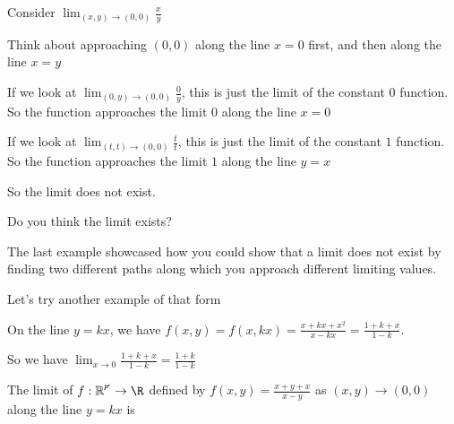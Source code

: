 \documentclass{ximera}
\begin{document}
	\begin{question}
		Consider $\displaystyle\lim_{(x,y) \to (0,0)} \frac{x}{y}$
		\begin{solution}
			\begin{hint}
				Think about approaching $(0,0)$ along the line $x=0$ first, and then along the line $x=y$
			\end{hint}
			\begin{hint}
				If we look at $\displaystyle\lim_{(0,y) \to (0,0)} \frac{0}{y}$, this is just the limit of the constant $0$ function.  So the function approaches the limit $0$ along
				the line $x=0$
			\end{hint}
			\begin{hint}
				If we look at $\displaystyle\lim_{(t,t) \to (0,0)} \frac{t}{t}$, this is just the limit of the constant $1$ function.  So the function approaches the limit $1$ along the 
				line $y=x$
			\end{hint}
			\begin{hint}
				So the limit does not exist.
			\end{hint}
			Do you think the limit exists?
				\begin{multiple-choice}
				\end{multiple-choice}
		\end{solution}
	\end{question}
	
	The last example showcased how you could show that a limit does not exist by finding two different paths along which you approach different limiting values.  
	
	Let's try another example of that form
	
	\begin{question}
		
	\begin{solution}
	\begin{hint}
		On the line $y=kx$, we have $f(x,y) = f(x,kx) = \frac{x+kx+x^2}{x-kx}  = \frac{1+k+x}{1-k }$.
	\end{hint}
	\begin{hint}
		So we have  $\displaystyle\lim_{x \to 0} \frac{1+k+x}{1-k} = \frac{1+k}{1-k}$ 
	\end{hint}
		The limit of $f: \mathbb{R^2} \to \R$ defined by $f(x,y) = \frac{x+y+x}{x-y}$ as $(x,y) \to (0,0)$ along the line $y=kx$ is \answer{$(1+k)/(1-k)$}
	\end{solution}		
	\end{question}
	
\end{document}
